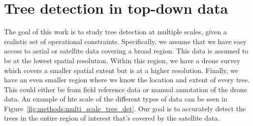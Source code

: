 %
%

\section{Tree detection in top-down data}
The goal of this work is to study tree detection at multiple scales, given a realistic set of operational constraints. Specifically, we assume that we have easy access to aerial or satellite data covering a broad region. This data is assumed to be at the lowest spatial resolution. Within this region, we have a drone survey which covers a smaller spatial extent but is at a higher resolution. Finally, we have an even smaller region where we know the location and extent of every tree. This could either be from field reference data or manual annotation of the drone data. An example of hte scale of the different types of data can be seen in Figure~\ref{fig:methods:multi_scale_tree_det}. Our goal is to accurately detect the trees in the entire region of interest that's covered by the satellite data. 

